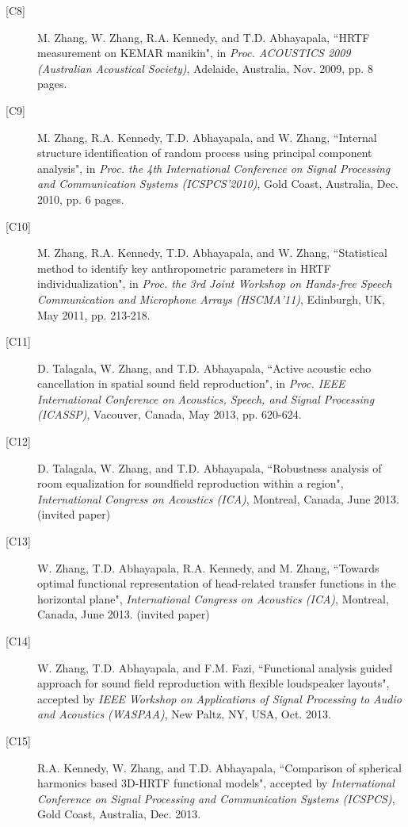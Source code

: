 \documentclass[11pt]{article}
\begin{document}
\begin{description}
\item[{[}C8{]}]M. Zhang, W. Zhang, R.A. Kennedy, and T.D. Abhayapala, ``HRTF measurement on KEMAR manikin",
in \emph{Proc. ACOUSTICS 2009 (Australian Acoustical Society)}, Adelaide, Australia, Nov. 2009, pp. 8 pages.

\item[{[}C9{]}]M. Zhang, R.A. Kennedy, T.D. Abhayapala, and W. Zhang, ``Internal structure identification of random process using principal component analysis", in \emph{Proc. the 4th International Conference on Signal Processing and Communication Systems (ICSPCS'2010)}, Gold Coast, Australia, Dec. 2010, pp. 6 pages.

\item[{[}C10{]}]M. Zhang, R.A. Kennedy, T.D. Abhayapala, and W. Zhang, ``Statistical method to identify key anthropometric parameters in HRTF individualization", in \emph{Proc. the 3rd Joint Workshop on Hands-free Speech Communication and Microphone Arrays (HSCMA'11)}, Edinburgh, UK,  May 2011, pp. 213-218.

\item[{[}C11{]} ]D. Talagala, W. Zhang, and T.D. Abhayapala, ``Active acoustic echo cancellation in spatial sound field reproduction", in \emph{Proc. IEEE International Conference on Acoustics, Speech, and Signal Processing (ICASSP)}, Vacouver, Canada, May 2013, pp. 620-624. 

\item[{[}C12{]}]D. Talagala, W. Zhang, and T.D. Abhayapala, ``Robustness analysis of room equalization for soundfield reproduction within a region", \emph{International Congress on Acoustics (ICA)}, Montreal, Canada, June 2013. (invited paper)

\item[{[}C13{]}]W. Zhang, T.D. Abhayapala, R.A. Kennedy, and M. Zhang, ``Towards optimal functional representation of head-related transfer functions in the horizontal plane", \emph{International Congress on Acoustics (ICA)}, Montreal, Canada, June 2013. (invited paper)

\item[{[}C14{]}]W. Zhang, T.D. Abhayapala, and F.M. Fazi, ``Functional analysis guided approach for sound field reproduction with flexible loudspeaker layouts", accepted by {\em IEEE Workshop on Applications of Signal Processing to Audio and Acoustics (WASPAA)}, New Paltz, NY, USA, Oct. 2013.


\item[{[}C15{]}]R.A. Kennedy, W. Zhang, and T.D. Abhayapala, ``Comparison of spherical harmonics based 3D-HRTF functional models", accepted by {\em International Conference on Signal Processing and Communication Systems (ICSPCS)}, Gold Coast, Australia, Dec. 2013.

\end{description}
\end{document}
